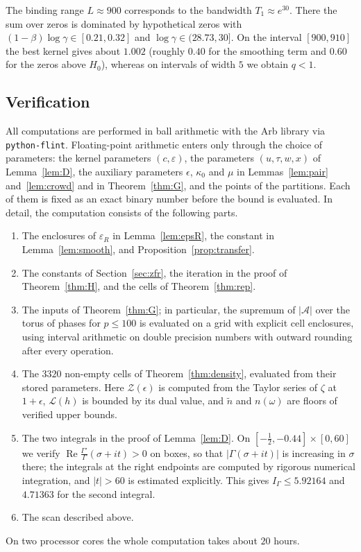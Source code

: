 \documentclass[11pt]{amsart}
\numberwithin{equation}{section}
\theoremstyle{definition}
\theoremstyle{remark}
\newcommand{\Rp}{\operatorname{Re}}
\newcommand{\eps}{\varepsilon}
\newcommand{\code}[1]{\texttt{#1}}
\begin{document}
The binding range $L \approx 900$ corresponds to the bandwidth $T_1 \approx e^{30}$.
There the sum over zeros is dominated by hypothetical zeros with $(1 - \beta)\log\gamma \in [0.21, 0.32]$ and $\log\gamma \in (28.73, 30]$.
On the interval $[900, 910]$ the best kernel gives about $1.002$ (roughly $0.40$ for the smoothing term and $0.60$ for the zeros above $H_0$), whereas on intervals of width $5$ we obtain $q < 1$.

\subsection*{Verification}
All computations are performed in ball arithmetic with the Arb library \cite{arb} via \code{python-flint}.
Floating-point arithmetic enters only through the choice of parameters: the kernel parameters $(c, \eps)$, the parameters $(u, \tau, w, x)$ of Lemma~\ref{lem:D}, the auxiliary parameters $\epsilon$, $\kappa_0$ and $\mu$ in Lemmas~\ref{lem:pair} and~\ref{lem:crowd} and in Theorem~\ref{thm:G}, and the points of the partitions.
Each of them is fixed as an exact binary number before the bound is evaluated.
In detail, the computation consists of the following parts.
\begin{enumerate}
\item The enclosures of $\eps_R$ in Lemma~\ref{lem:epsR}, the constant in Lemma~\ref{lem:smooth}, and Proposition~\ref{prop:transfer}.
\item The constants of Section~\ref{sec:zfr}, the iteration in the proof of Theorem~\ref{thm:H}, and the cells of Theorem~\ref{thm:rep}.
\item The inputs of Theorem~\ref{thm:G}; in particular, the supremum of $|\mathcal A|$ over the torus of phases for $p \leq 100$ is evaluated on a grid with explicit cell enclosures, using interval arithmetic on double precision numbers with outward rounding after every operation.
\item The $3320$ non-empty cells of Theorem~\ref{thm:density}, evaluated from their stored parameters.
Here $\mathcal Z(\epsilon)$ is computed from the Taylor series of $\zeta$ at $1 + \epsilon$, $\mathcal L(h)$ is bounded by its dual value, and $\tilde n$ and $n(\omega)$ are floors of verified upper bounds.
\item The two integrals in the proof of Lemma~\ref{lem:D}.
On $[-\frac12, -0.44] \times [0, 60]$ we verify $\Rp\frac{\Gamma'}{\Gamma}(\sigma + it) > 0$ on boxes, so that $|\Gamma(\sigma + it)|$ is increasing in $\sigma$ there; the integrals at the right endpoints are computed by rigorous numerical integration, and $|t| > 60$ is estimated explicitly.
This gives $I_\Gamma \leq 5.92164$ and $4.71363$ for the second integral.
\item The scan described above.
\end{enumerate}
On two processor cores the whole computation takes about $20$ hours.
\end{document}
